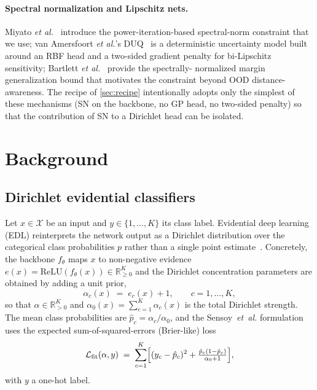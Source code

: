 \documentclass[review,5p,times]{elsarticle}
\begin{document}
\paragraph{Spectral normalization and Lipschitz nets.}
Miyato \textit{et al.}~\citep{miyato2018sngan} introduce the
power-iteration-based spectral-norm constraint that we use; van Amersfoort
\textit{et al.}'s DUQ~\citep{vanamersfoort2020duq} is a deterministic
uncertainty model built around an RBF head and a two-sided gradient
penalty for bi-Lipschitz sensitivity; Bartlett
\textit{et al.}~\citep{bartlett2017spectrally} provide the spectrally-
normalized margin generalization bound that motivates the constraint
beyond OOD distance-awareness. The recipe of \autoref{sec:recipe}
intentionally adopts only the simplest of these mechanisms (SN on the
backbone, no GP head, no two-sided penalty) so that the contribution of
SN to a Dirichlet head can be isolated.

\section{Background}\label{sec:background}

\subsection{Dirichlet evidential classifiers}
Let $x\!\in\!\mathcal{X}$ be an input and $y\!\in\!\{1,\dots,K\}$ its class
label. Evidential deep learning (EDL) reinterprets the network output as a
Dirichlet distribution over the categorical class probabilities $p$ rather
than a single point estimate~\citep{sensoy2018edl}. Concretely, the backbone
$f_\theta$ maps $x$ to non-negative evidence $e(x)\!=\!\mathrm{ReLU}(f_\theta(x))
\!\in\!\mathbb{R}_{\ge 0}^{K}$ and the Dirichlet concentration parameters
are obtained by adding a unit prior,
\begin{equation}
  \alpha_c(x) \;=\; e_c(x) + 1, \qquad c=1,\dots,K,
  \label{eq:alpha}
\end{equation}
so that $\alpha\!\in\!\mathbb{R}_{>0}^{K}$ and $\alpha_0(x)\!=\!\sum_{c=1}^{K}
\alpha_c(x)$ is the total Dirichlet strength. The mean class probabilities
are $\hat p_c = \alpha_c/\alpha_0$, and the Sensoy~\textit{et~al.} formulation
uses the expected sum-of-squared-errors (Brier-like) loss
\begin{equation}
  \mathcal{L}_{\text{fit}}(\alpha,y) \;=\; \sum_{c=1}^{K}\Bigl[(y_c-\hat p_c)^2
  + \tfrac{\hat p_c(1-\hat p_c)}{\alpha_0+1}\Bigr],
  \label{eq:fit}
\end{equation}
with $y$ a one-hot label.
\end{document}
